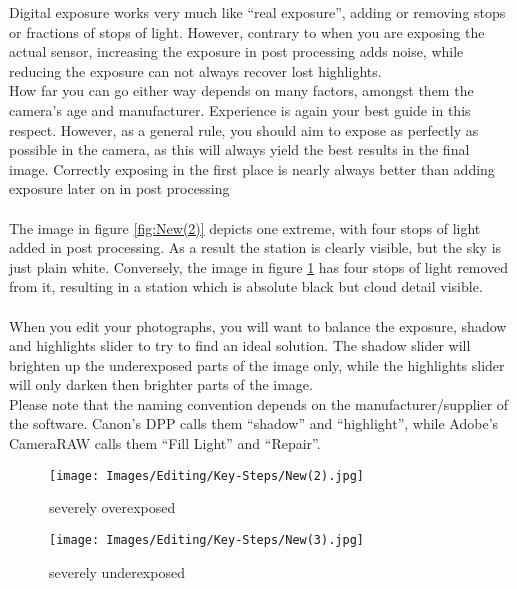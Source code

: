 Digital \gls{exposure} works very much like ``real \gls{exposure}'', adding or removing \glspl{stop} or fractions of \glspl{stop} of light. However, contrary to when you are exposing the actual \gls{sensor}, increasing the \gls{exposure} in post processing adds noise, while reducing the \gls{exposure} can not always recover lost highlights.
\\
How far you can go either way depends on many factors, amongst them the camera's age and manufacturer. Experience is again your best guide in this respect. However, as a general rule, you should aim to expose as perfectly as possible in the camera, as this will always yield the best results in the final image. Correctly exposing in the first place is nearly always better than adding \gls{exposure} later on in post processing
\\
\\
The image in figure \ref{fig:New(2)} depicts one extreme, with four \glspl{stop} of light added in post processing. As a result the station is clearly visible, but the sky is just plain white. Conversely, the image in figure \ref{fig:New(3)} has four \glspl{stop} of light removed from it, resulting in a station which is absolute black but cloud detail visible.
\\
\\
When you edit your photographs, you will want to balance the \gls{exposure}, shadow and highlights slider to try to find an ideal solution. The shadow slider will brighten up the underexposed parts of the image only, while the highlights slider will only darken then brighter parts of the image.
\\
Please note that the naming convention depends on the manufacturer/supplier of the software. Canon's DPP calls them ``shadow'' and ``highlight'', while Adobe's CameraRAW calls them ``Fill Light'' and ``Repair''.

\begin{figure}[htbp]
\begin{minipage}{.5\textwidth}
	\centering
		\texttt{[image: Images/Editing/Key-Steps/New(2).jpg]}
	\caption{severely overexposed}
	\label{fig:New(2)}
\end{minipage}
\begin{minipage}{.5\textwidth}
	\centering
		\texttt{[image: Images/Editing/Key-Steps/New(3).jpg]}
	\caption{severely underexposed}
	\label{fig:New(3)}
\end{minipage}
\end{figure}


